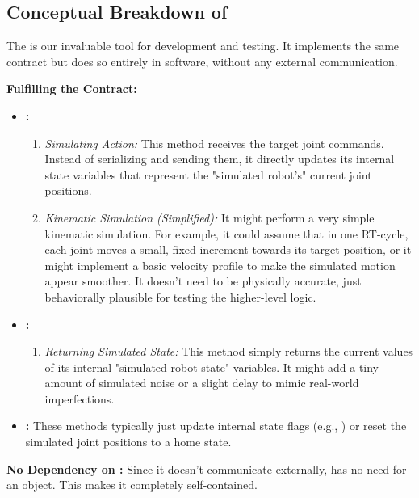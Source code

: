 
\subsection{Conceptual Breakdown of }
\label{subsec:conceptual_fake_motion_interface}

The  is our invaluable tool for development and testing. It implements the same  contract but does so entirely in software, without any external communication.


    \textbf{Fulfilling the  Contract:}
        \begin{itemize}
            \item \textbf{:}
                \begin{enumerate}
                    \item \textit{Simulating Action:} This method receives the target joint commands. Instead of serializing and sending them, it directly updates its internal state variables that represent the "simulated robot's" current joint positions.
                    \item \textit{Kinematic Simulation (Simplified):} It might perform a very simple kinematic simulation. For example, it could assume that in one RT-cycle, each joint moves a small, fixed increment towards its target position, or it might implement a basic velocity profile to make the simulated motion appear smoother. It doesn't need to be physically accurate, just behaviorally plausible for testing the higher-level logic.
                \end{enumerate}
            \item \textbf{:}
                \begin{enumerate}
                    \item \textit{Returning Simulated State:} This method simply returns the current values of its internal "simulated robot state" variables. It might add a tiny amount of simulated noise or a slight delay to mimic real-world imperfections.
                \end{enumerate}
            \item \textbf{:} These methods typically just update internal state flags (e.g., ) or reset the simulated joint positions to a home state.
        \end{itemize}
    \textbf{No Dependency on :} Since it doesn't communicate externally,  has no need for an  object. This makes it completely self-contained.


